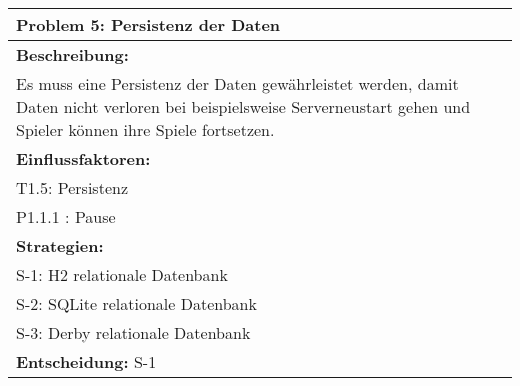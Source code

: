 \documentclass[fontsize=12pt,paper=a4,twoside]{scrartcl}
\begin{document}
\begin{longtable}{|p{15cm}|}
\hline
Problem 5: Persistenz der Daten                                                                           
\\ \hline                                                                                                                                                                                                                                                                                                                                                                                                                                                                                                                                                        
\textbf{Beschreibung:} \\
Es muss eine Persistenz der Daten gewährleistet werden, damit Daten nicht verloren bei beispielsweise Serverneustart gehen und Spieler können ihre Spiele fortsetzen.
\\ \hline
\textbf{Einflussfaktoren:} \\
T1.5: Persistenz \\
P1.1.1 : Pause
\\ \hline
\textbf{Strategien:} \\
S-1: H2 relationale Datenbank\\
S-2: SQLite relationale Datenbank\\
S-3: Derby relationale Datenbank
 \\ \hline
 \textbf{Entscheidung:} S-1
\\ \hline
\end{longtable}
\end{document}
